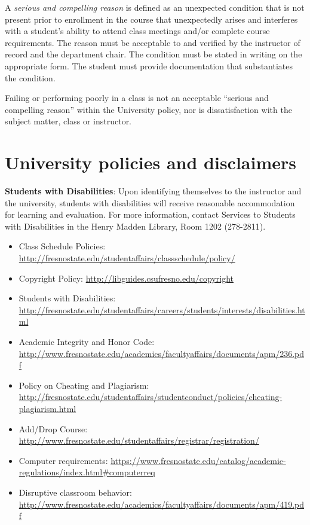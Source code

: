 A \emph{serious and compelling reason} is defined as an unexpected
condition that is not present prior to enrollment in the course that
unexpectedly arises and interferes with a student's ability to attend
class meetings and/or complete course requirements. The reason must be
acceptable to and verified by the instructor of record and the
department chair. The condition must be stated in writing on the
appropriate form. The student must provide documentation that
substantiates the condition.

Failing or performing poorly in a class is not an acceptable ``serious
and compelling reason'' within the University policy, nor is
dissatisfaction with the subject matter, class or instructor.

\hypertarget{university-policies-and-disclaimers}{%
\section{University policies and
disclaimers}\label{university-policies-and-disclaimers}}

\textbf{Students with Disabilities}: Upon identifying themselves to the
instructor and the university, students with disabilities will receive
reasonable accommodation for learning and evaluation. For more
information, contact Services to Students with Disabilities in the Henry
Madden Library, Room 1202 (278-2811).

\begin{itemize}
\tightlist
\item
  Class Schedule Policies:
  \url{http://fresnostate.edu/studentaffairs/classschedule/policy/}
\item
  Copyright Policy: \url{http://libguides.csufresno.edu/copyright}
\item
  Students with Disabilities:
  \url{http://fresnostate.edu/studentaffairs/careers/students/interests/disabilities.html}
\item
  Academic Integrity and Honor Code:
  \url{http://www.fresnostate.edu/academics/facultyaffairs/documents/apm/236.pdf}
\item
  Policy on Cheating and Plagiarism:
  \url{http://fresnostate.edu/studentaffairs/studentconduct/policies/cheating-plagiarism.html}
\item
  Add/Drop Course:
  \url{http://www.fresnostate.edu/studentaffairs/registrar/registration/}
\item
  Computer requirements:
  \url{https://www.fresnostate.edu/catalog/academic-regulations/index.html\#computerreq}
\item
  Disruptive classroom behavior:
  \url{http://www.fresnostate.edu/academics/facultyaffairs/documents/apm/419.pdf}
\end{itemize}

